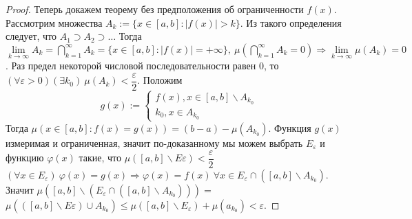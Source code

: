 \begin{proof}
Теперь докажем теорему без предположения об ограниченности $f(x)$. Рассмотрим множества $A_k:=\{x\in [a,b]: |f(x)|>k \}$. Из такого определения следует, что $A_1 \supset A_2 \supset \ldots$ Тогда $\lim\limits_{k\to\infty} A_k=\bigcap\limits_{k=1}^{\infty}A_k={\{x\in [a,b]: | f(x) | =+\infty\},}\ \mu(\bigcap\limits_{k=1}^{\infty}A_k=0) \Rightarrow \lim\limits_{k\to\infty}\mu (A_k)=0$. Раз предел некоторой числовой последовательности равен 0, то $(\forall \varepsilon >0)(\exists k_0)\ \mu (A_k)<\dfrac{\varepsilon}{2}$. Положим 
\begin{equation*}
    g(x):=\begin{cases}
    f(x), x\in [a,b]\backslash A_{k_0}\\
    k_0, x \in A_{k_0}
    \end{cases}
\end{equation*}
Тогда $\mu (x\in [a,b]:f(x)=g(x))=(b-a)-\mu(A_{k_0})$. Функция $g(x)$ измеримая и ограниченная, значит по-доказанному мы можем выбрать $E_\varepsilon$ и функцию $\varphi(x)$ такие, что ${\mu ([a,b]\backslash E\varepsilon)<\dfrac{\varepsilon}{2} }$ $(\forall x \in E_\varepsilon)\ \varphi(x)=g(x) \Rightarrow \varphi(x) = f(x)\  \forall x \in E_\varepsilon \cap ([a,b]\backslash A_{k_0})$. Значит $\mu([a,b]\backslash(E_\varepsilon\cap([a,b]\backslash A_{k_0})))=$ $\mu(([a,b]\backslash E\varepsilon)\cup A_{k_0})\leqslant \mu([a,b]\backslash E_\varepsilon)+\mu(a_{k_0})<\varepsilon.$

\end{proof}